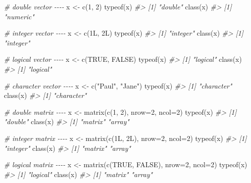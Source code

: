 \documentclass[
]{book}
\newenvironment{Shaded}{\begin{snugshade}}{\end{snugshade}}
\newcommand{\AttributeTok}[1]{\textcolor[rgb]{0.77,0.63,0.00}{#1}}
\newcommand{\CommentTok}[1]{\textcolor[rgb]{0.56,0.35,0.01}{\textit{#1}}}
\newcommand{\ConstantTok}[1]{\textcolor[rgb]{0.00,0.00,0.00}{#1}}
\newcommand{\DecValTok}[1]{\textcolor[rgb]{0.00,0.00,0.81}{#1}}
\newcommand{\FunctionTok}[1]{\textcolor[rgb]{0.00,0.00,0.00}{#1}}
\newcommand{\NormalTok}[1]{#1}
\newcommand{\OtherTok}[1]{\textcolor[rgb]{0.56,0.35,0.01}{#1}}
\newcommand{\StringTok}[1]{\textcolor[rgb]{0.31,0.60,0.02}{#1}}
\begin{document}
\begin{Shaded}
\begin{Highlighting}[]
\CommentTok{\# double vector {-}{-}{-}{-}}
\NormalTok{x }\OtherTok{\textless{}{-}} \FunctionTok{c}\NormalTok{(}\DecValTok{1}\NormalTok{, }\DecValTok{2}\NormalTok{)}
\FunctionTok{typeof}\NormalTok{(x)}
\CommentTok{\#\textgreater{} [1] "double"}
\FunctionTok{class}\NormalTok{(x)}
\CommentTok{\#\textgreater{} [1] "numeric"}

\CommentTok{\# integer vector {-}{-}{-}{-}}
\NormalTok{x }\OtherTok{\textless{}{-}} \FunctionTok{c}\NormalTok{(1L, 2L)}
\FunctionTok{typeof}\NormalTok{(x)}
\CommentTok{\#\textgreater{} [1] "integer"}
\FunctionTok{class}\NormalTok{(x)}
\CommentTok{\#\textgreater{} [1] "integer"}

\CommentTok{\# logical vector {-}{-}{-}{-}}
\NormalTok{x }\OtherTok{\textless{}{-}} \FunctionTok{c}\NormalTok{(}\ConstantTok{TRUE}\NormalTok{, }\ConstantTok{FALSE}\NormalTok{)}
\FunctionTok{typeof}\NormalTok{(x)}
\CommentTok{\#\textgreater{} [1] "logical"}
\FunctionTok{class}\NormalTok{(x)}
\CommentTok{\#\textgreater{} [1] "logical"}

\CommentTok{\# character vector {-}{-}{-}{-}}
\NormalTok{x }\OtherTok{\textless{}{-}} \FunctionTok{c}\NormalTok{(}\StringTok{"Paul"}\NormalTok{, }\StringTok{"Jane"}\NormalTok{)}
\FunctionTok{typeof}\NormalTok{(x)}
\CommentTok{\#\textgreater{} [1] "character"}
\FunctionTok{class}\NormalTok{(x)}
\CommentTok{\#\textgreater{} [1] "character"}

\CommentTok{\# double matrix {-}{-}{-}{-}}
\NormalTok{x }\OtherTok{\textless{}{-}} \FunctionTok{matrix}\NormalTok{(}\FunctionTok{c}\NormalTok{(}\DecValTok{1}\NormalTok{, }\DecValTok{2}\NormalTok{), }\AttributeTok{nrow=}\DecValTok{2}\NormalTok{, }\AttributeTok{ncol=}\DecValTok{2}\NormalTok{)}
\FunctionTok{typeof}\NormalTok{(x)}
\CommentTok{\#\textgreater{} [1] "double"}
\FunctionTok{class}\NormalTok{(x)}
\CommentTok{\#\textgreater{} [1] "matrix" "array"}

\CommentTok{\# integer matrix {-}{-}{-}{-}}
\NormalTok{x }\OtherTok{\textless{}{-}} \FunctionTok{matrix}\NormalTok{(}\FunctionTok{c}\NormalTok{(1L, 2L), }\AttributeTok{nrow=}\DecValTok{2}\NormalTok{, }\AttributeTok{ncol=}\DecValTok{2}\NormalTok{)}
\FunctionTok{typeof}\NormalTok{(x)}
\CommentTok{\#\textgreater{} [1] "integer"}
\FunctionTok{class}\NormalTok{(x)}
\CommentTok{\#\textgreater{} [1] "matrix" "array"}

\CommentTok{\# logical matrix {-}{-}{-}{-}}
\NormalTok{x }\OtherTok{\textless{}{-}} \FunctionTok{matrix}\NormalTok{(}\FunctionTok{c}\NormalTok{(}\ConstantTok{TRUE}\NormalTok{, }\ConstantTok{FALSE}\NormalTok{), }\AttributeTok{nrow=}\DecValTok{2}\NormalTok{, }\AttributeTok{ncol=}\DecValTok{2}\NormalTok{)}
\FunctionTok{typeof}\NormalTok{(x)}
\CommentTok{\#\textgreater{} [1] "logical"}
\FunctionTok{class}\NormalTok{(x)}
\CommentTok{\#\textgreater{} [1] "matrix" "array"}


\end{Highlighting}
\end{Shaded}
\end{document}
